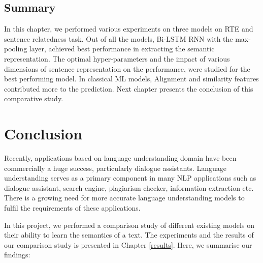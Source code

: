 \documentclass[12pt]{report} %
\begin{document}
\section{Summary}

In this chapter, we performed various experiments on three models on RTE and sentence relatedness task. Out of all the models, Bi-LSTM RNN with the max-pooling layer, achieved best performance in extracting the semantic representation. The optimal hyper-parameters and the impact of various dimensions of sentence representation on the performance, were studied for the best performing model. In classical ML models, Alignment and similarity features contributed more to the prediction. Next chapter presents the conclusion of this comparative study.


\chapter{Conclusion}

Recently, applications based on language understanding domain have been commercially a huge success, particularly dialogue assistants. Language understanding serves as a primary component in many NLP applications such as dialogue assistant, search engine, plagiarism checker, information extraction etc. There is a growing need for more accurate language understanding models to fulfil the requirements of these applications. 

In this project, we performed a comparison study of  different existing models on their ability to learn the semantics of a text.  
The experiments and the results of our comparison study is presented in Chapter \ref{results}. Here, we summarise our findings:
\end{document}
